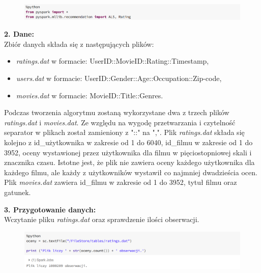 \documentclass[12pt,a4paper]{report}
\begin{document}
\begin{figure}[H]
\includegraphics[scale=0.5]{obrazy/ALS1.PNG} 
\end{figure}

\textbf{2. Dane:}
\\Zbiór danych składa się z następujących plików: 
\begin{itemize}
\item \textit{ratings.dat} w formacie: UserID::MovieID::Rating::Timestamp,
\item \textit{users.dat} w formacie: UserID::Gender::Age::Occupation::Zip-code,
\item \textit{movies.dat} w formacie: MovieID::Title::Genres.
\end{itemize}
Podczas tworzenia algorytmu zostaną wykorzystane dwa z trzech plików \textit{ratings.dat} i \textit{movies.dat}. 
Ze względu na wygodę przetwarzania i czytelność separator w plikach został zamieniony z "::" na ",".
Plik \textit{ratings.dat} składa się kolejno z id\_użytkownika w zakresie od 1 do 6040, id\_filmu w zakresie od 1 do 3952, oceny wystawionej przez użytkownika dla filmu w pięciostopniowej skali i znacznika czasu. Istotne jest, że plik nie zawiera oceny każdego użytkownika dla każdego filmu, ale każdy z użytkowników wystawił co najmniej dwadzieścia ocen.
Plik \textit{movies.dat} zawiera id\_filmu w zakresie od 1 do 3952, tytuł filmu oraz gatunek.
\bigskip

\textbf{3. Przygotowanie danych:}
\\Wczytanie pliku \textit{ratings.dat} oraz sprawdzenie ilości obserwacji.

\begin{figure}[H]
\includegraphics[scale=0.5]{obrazy/ALS2.PNG} 
\end{figure}
\end{document}
